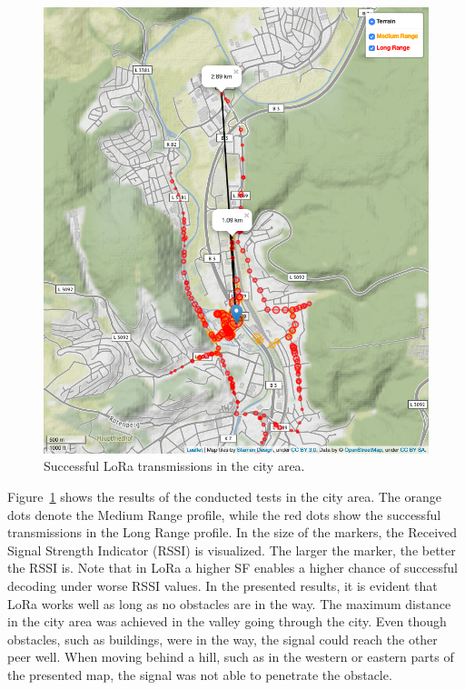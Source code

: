 \begin{figure}[ht!]
    \centering
    \includegraphics[width=\textwidth]{gfx/city.png}
    \caption{Successful LoRa transmissions in the city area.}
    \label{fig:eval_city_new}
\end{figure}

Figure~\ref{fig:eval_city_new} shows the results of the conducted tests in the city area.
The orange dots denote the Medium Range profile, while the red dots show the successful transmissions in the Long Range profile.
In the size of the markers, the Received Signal Strength Indicator (RSSI) is visualized. The larger the marker, the better the RSSI is. 
Note that in LoRa a higher SF enables a higher chance of successful decoding under worse RSSI values.
In the presented results, it is evident that LoRa works well as long as no obstacles are in the way. 
The maximum distance in the city area was achieved in the valley going through the city. 
Even though obstacles, such as buildings, were in the way, the signal could reach the other peer well.
When moving behind a hill, such as in the western or eastern parts of the presented map, the signal was not able to penetrate the obstacle.

